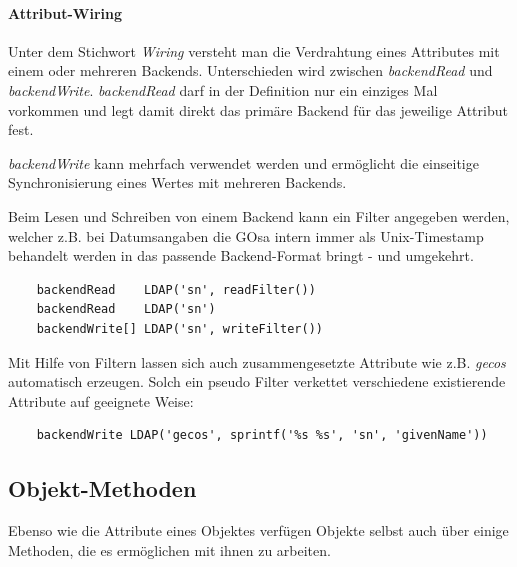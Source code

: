 \paragraph{Attribut-Wiring}

Unter dem Stichwort \textit{Wiring} versteht man die Verdrahtung eines Attributes mit
einem oder mehreren Backends. Unterschieden wird zwischen \textit{backendRead} und
\textit{backendWrite}. \textit{backendRead} darf in der Definition nur ein einziges
Mal vorkommen und legt damit direkt das primäre Backend für das jeweilige Attribut fest.

\textit{backendWrite} kann mehrfach verwendet werden und ermöglicht die
einseitige Synchronisierung eines Wertes mit mehreren Backends.

Beim Lesen und Schreiben von einem Backend kann ein Filter angegeben werden, welcher
z.B. bei Datumsangaben die GOsa intern immer als Unix-Timestamp behandelt werden
in das passende Backend-Format bringt - und umgekehrt.

\begin{verbatim}
    backendRead    LDAP('sn', readFilter())
    backendRead    LDAP('sn')
    backendWrite[] LDAP('sn', writeFilter())
\end{verbatim}

Mit Hilfe von Filtern lassen sich auch zusammengesetzte Attribute wie z.B. 
\textit{gecos} automatisch erzeugen. Solch ein pseudo Filter verkettet verschiedene
existierende Attribute auf geeignete Weise:

\begin{verbatim}
    backendWrite LDAP('gecos', sprintf('%s %s', 'sn', 'givenName'))
\end{verbatim}

    
\subsection{Objekt-Methoden} 

Ebenso wie die Attribute eines Objektes verfügen Objekte selbst auch über
einige Methoden, die es ermöglichen mit ihnen zu arbeiten.

